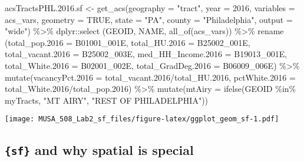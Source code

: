 \documentclass[
]{article}
\newenvironment{Shaded}{\begin{snugshade}}{\end{snugshade}}
\newcommand{\AttributeTok}[1]{\textcolor[rgb]{0.77,0.63,0.00}{#1}}
\newcommand{\ConstantTok}[1]{\textcolor[rgb]{0.00,0.00,0.00}{#1}}
\newcommand{\DecValTok}[1]{\textcolor[rgb]{0.00,0.00,0.81}{#1}}
\newcommand{\FloatTok}[1]{\textcolor[rgb]{0.00,0.00,0.81}{#1}}
\newcommand{\FunctionTok}[1]{\textcolor[rgb]{0.00,0.00,0.00}{#1}}
\newcommand{\NormalTok}[1]{#1}
\newcommand{\OtherTok}[1]{\textcolor[rgb]{0.56,0.35,0.01}{#1}}
\newcommand{\SpecialCharTok}[1]{\textcolor[rgb]{0.00,0.00,0.00}{#1}}
\newcommand{\StringTok}[1]{\textcolor[rgb]{0.31,0.60,0.02}{#1}}
\begin{document}
\begin{Shaded}
\begin{Highlighting}[]
\NormalTok{acsTractsPHL.}\FloatTok{2016.}\NormalTok{sf }\OtherTok{\textless{}{-}} \FunctionTok{get\_acs}\NormalTok{(}\AttributeTok{geography =} \StringTok{"tract"}\NormalTok{,}
                             \AttributeTok{year =} \DecValTok{2016}\NormalTok{, }
                             \AttributeTok{variables =}\NormalTok{ acs\_vars, }
                             \AttributeTok{geometry =} \ConstantTok{TRUE}\NormalTok{, }
                             \AttributeTok{state =} \StringTok{"PA"}\NormalTok{, }
                             \AttributeTok{county =} \StringTok{"Philadelphia"}\NormalTok{, }
                             \AttributeTok{output =} \StringTok{"wide"}\NormalTok{) }\SpecialCharTok{\%\textgreater{}\%} 
\NormalTok{  dplyr}\SpecialCharTok{::}\FunctionTok{select}\NormalTok{ (GEOID, NAME, }\FunctionTok{all\_of}\NormalTok{(acs\_vars)) }\SpecialCharTok{\%\textgreater{}\%}
  \FunctionTok{rename}\NormalTok{ (}\AttributeTok{total\_pop.2016 =}\NormalTok{ B01001\_001E,}
          \AttributeTok{total\_HU.2016 =}\NormalTok{ B25002\_001E,}
          \AttributeTok{total\_vacant.2016 =}\NormalTok{ B25002\_003E,}
          \AttributeTok{med\_HH\_Income.2016 =}\NormalTok{ B19013\_001E,}
          \AttributeTok{total\_White.2016 =}\NormalTok{ B02001\_002E,}
          \AttributeTok{total\_GradDeg.2016 =}\NormalTok{ B06009\_006E) }\SpecialCharTok{\%\textgreater{}\%}
  \FunctionTok{mutate}\NormalTok{(}\AttributeTok{vacancyPct.2016 =}\NormalTok{ total\_vacant}\FloatTok{.2016}\SpecialCharTok{/}\NormalTok{total\_HU}\FloatTok{.2016}\NormalTok{,}
         \AttributeTok{pctWhite.2016 =}\NormalTok{ total\_White}\FloatTok{.2016}\SpecialCharTok{/}\NormalTok{total\_pop}\FloatTok{.2016}\NormalTok{) }\SpecialCharTok{\%\textgreater{}\%}
  \FunctionTok{mutate}\NormalTok{(}\AttributeTok{mtAiry =} \FunctionTok{ifelse}\NormalTok{(GEOID }\SpecialCharTok{\%in\%}\NormalTok{ myTracts, }\StringTok{"MT AIRY"}\NormalTok{, }\StringTok{"REST OF PHILADELPHIA"}\NormalTok{))}
\end{Highlighting}
\end{Shaded}

\texttt{[image: MUSA\_508\_Lab2\_sf\_files/figure-latex/ggplot\_geom\_sf-1.pdf]}

\hypertarget{sf-and-why-spatial-is-special}{%
\subsection{\texorpdfstring{\texttt{\{sf\}} and why spatial is
special}{\{sf\} and why spatial is special}}\label{sf-and-why-spatial-is-special}}
\end{document}
